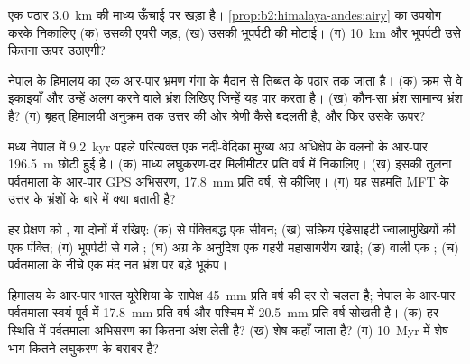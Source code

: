 \begin{exercise}[$\star$]\label{exo:b2:himalaya-andes:1}
एक पठार \qty{3.0}{km} की माध्य ऊँचाई पर खड़ा है।
\cref{prop:b2:himalaya-andes:airy} का उपयोग करके निकालिए (क) उसकी एयरी जड़, (ख) उसकी भूपर्पटी की मोटाई।
(ग) \qty{10}{km} और भूपर्पटी उसे कितना ऊपर उठाएगी?
\end{exercise}

\begin{exercise}[$\star$]\label{exo:b2:himalaya-andes:2}
नेपाल के हिमालय का एक आर-पार भ्रमण गंगा के मैदान से तिब्बत के पठार तक जाता है।
(क) क्रम से वे इकाइयाँ और उन्हें अलग करने वाले भ्रंश लिखिए जिन्हें यह पार करता है। (ख) कौन-सा भ्रंश
सामान्य भ्रंश है? (ग) बृहत् हिमालयी अनुक्रम तक उत्तर की ओर  श्रेणी कैसे बदलती है,
और फिर उसके ऊपर?
\end{exercise}

\begin{exercise}[$\star$]\label{exo:b2:himalaya-andes:3}
मध्य नेपाल में \qty{9.2}{kyr} पहले परित्यक्त एक नदी-वेदिका मुख्य अग्र अधिक्षेप के वलनों के आर-पार
\qty{196.5}{m} छोटी हुई है। (क) माध्य लघुकरण-दर
मिलीमीटर प्रति वर्ष में निकालिए। (ख) इसकी तुलना पर्वतमाला के आर-पार GPS अभिसरण,
\qty{17.8}{mm} प्रति वर्ष, से कीजिए। (ग) यह सहमति MFT के उत्तर के भ्रंशों के बारे में क्या बताती है?
\end{exercise}

\begin{exercise}[$\star$]\label{exo:b2:himalaya-andes:4}
हर प्रेक्षण को ,  या दोनों में रखिए: (क)  से
पंक्तिबद्ध एक सीवन; (ख) सक्रिय एंडेसाइटी ज्वालामुखियों की एक पंक्ति; (ग) भूपर्पटी से गले
; (घ) अग्र के अनुदिश एक गहरी महासागरीय खाई; (ङ)  वाली एक ;
(च) पर्वतमाला के नीचे एक मंद नत भ्रंश पर बड़े भूकंप।
\end{exercise}

\begin{exercise}[$\star\star$]\label{exo:b2:himalaya-andes:5}
हिमालय के आर-पार भारत यूरेशिया के सापेक्ष \qty{45}{mm} प्रति वर्ष की दर से चलता है; नेपाल के आर-पार
पर्वतमाला स्वयं पूर्व में \qty{17.8}{mm} प्रति वर्ष और पश्चिम में \qty{20.5}{mm} प्रति वर्ष सोखती है।
(क) हर स्थिति में पर्वतमाला अभिसरण का कितना अंश लेती है? (ख)
शेष कहाँ जाता है? (ग) \qty{10}{Myr} में शेष भाग कितने लघुकरण के बराबर है?
\end{exercise}

